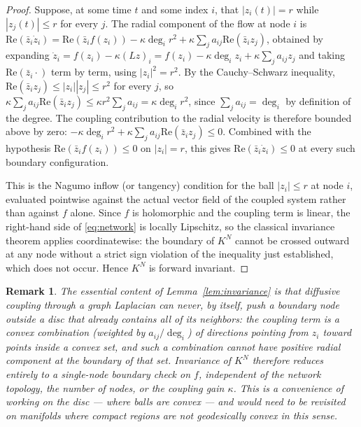 \documentclass[preprint,12pt,authoryear]{elsarticle}
\newtheorem{remark}{Remark}
\newtheorem{proof}{Proof}
\begin{document}
\begin{proof}
Suppose, at some time $t$ and some index $i$, that $|z_i(t)|=r$ while $|z_j(t)|\le r$ for every $j$. The radial component of the flow at node $i$ is $\mathrm{Re}(\bar z_i\dot z_i)=\mathrm{Re}(\bar z_if(z_i))-\kappa\deg_ir^2+\kappa\sum_ja_{ij}\mathrm{Re}(\bar z_iz_j)$, obtained by expanding $\dot z_i=f(z_i)-\kappa(Lz)_i=f(z_i)-\kappa\deg_iz_i+\kappa\sum_ja_{ij}z_j$ and taking $\mathrm{Re}(\bar z_i\cdot)$ term by term, using $|z_i|^2=r^2$. By the Cauchy--Schwarz inequality, $\mathrm{Re}(\bar z_iz_j)\le|z_i||z_j|\le r^2$ for every $j$, so $\kappa\sum_ja_{ij}\mathrm{Re}(\bar z_iz_j)\le\kappa r^2\sum_ja_{ij}=\kappa\deg_ir^2$, since $\sum_ja_{ij}=\deg_i$ by definition of the degree. The coupling contribution to the radial velocity is therefore bounded above by zero: $-\kappa\deg_ir^2+\kappa\sum_ja_{ij}\mathrm{Re}(\bar z_iz_j)\le0$. Combined with the hypothesis $\mathrm{Re}(\bar z_if(z_i))\le0$ on $|z_i|=r$, this gives $\mathrm{Re}(\bar z_i\dot z_i)\le0$ at every such boundary configuration.

This is the Nagumo inflow (or tangency) condition for the ball $|z_i|\le r$ at node $i$, evaluated pointwise against the actual vector field of the coupled system rather than against $f$ alone. Since $f$ is holomorphic and the coupling term is linear, the right-hand side of \eqref{eq:network} is locally Lipschitz, so the classical invariance theorem applies coordinatewise: the boundary of $K^N$ cannot be crossed outward at any node without a strict sign violation of the inequality just established, which does not occur. Hence $K^N$ is forward invariant.
\end{proof}

\begin{remark}
The essential content of Lemma~\ref{lem:invariance} is that diffusive coupling through a graph Laplacian can never, by itself, push a boundary node outside a disc that already contains all of its neighbors: the coupling term is a convex combination (weighted by $a_{ij}/\deg_i$) of directions pointing from $z_i$ toward points inside a convex set, and such a combination cannot have positive radial component at the boundary of that set. Invariance of $K^N$ therefore reduces entirely to a single-node boundary check on $f$, independent of the network topology, the number of nodes, or the coupling gain $\kappa$. This is a convenience of working on the disc — where balls are convex — and would need to be revisited on manifolds where compact regions are not geodesically convex in this sense.
\end{remark}
\end{document}
